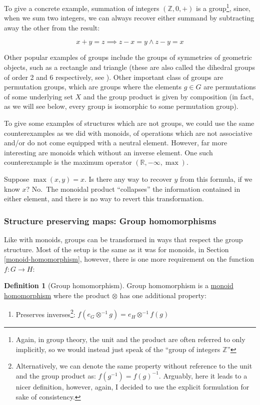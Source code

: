 \documentclass[
]{book}
\providecommand{\tightlist}{%
  \setlength{\itemsep}{0pt}\setlength{\parskip}{0pt}}
\theoremstyle{definition}
\newtheorem{definition}{Definition}[chapter]
\theoremstyle{definition}
\theoremstyle{definition}
\theoremstyle{definition}
\theoremstyle{remark}
\begin{document}
To give a concrete example, summation of integers \((\mathbb{Z}, 0, +)\) is a group\footnote{Again, in group theory, the unit and the product are often referred to only implicitly, so we would instead just speak of the ``group of integers \(\mathbb{Z}\)''}, since, when we sum two integers, we can always recover either summand by subtracting away the other from the result:

\[x + y = z \implies z - x = y \wedge z - y = x\]

Other popular examples of groups include the groups of symmetries of geometric objects, such as a rectangle and triangle (these are also called the dihedral groups of order 2 and 6 respectively, see ). Other important class of groups are permutation groups, which are groups where the elements \(g \in G\) are permutations of some underlying set \(X\) and the group product is given by composition (in fact, as we will see below, every group is isomorphic to some permutation group).

To give some examples of structures which are not groups, we could use the same counterexamples as we did with monoids, of operations which are not associative and/or do not come equipped with a neutral element. However, far more interesting are monoids which without an inverse element. One such counterexample is the maximum operator \((\mathbb{R}, -\infty, \max)\).

Suppose \(\max(x, y) = x\). Is there any way to recover \(y\) from this formula, if we know \(x\)? No.~The monoidal product ``collapses'' the information contained in either element, and there is no way to revert this transformation.

\subsubsection{Structure preserving maps: Group homomorphisms}\label{group-homomorphism}

Like with monoids, groups can be transformed in ways that respect the group structure. Most of the setup is the same as it was for monoids, in Section \ref{monoid-homomorphism}, however, there is one more requirement on the function \(f: G \to H\):

\begin{definition}[Group homomorphism]

Group homomorphism is a \hyperref[monoid-homomorphism]{monoid homomorphism} where the product \(\otimes\) has one additional property:

\begin{enumerate}
\def\labelenumi{\arabic{enumi}.}
\setcounter{enumi}{2}
\tightlist
\item
  Preserves inverses\footnote{Alternatively, we can denote the same property without reference to the unit and the group product as: \(f(g^{-1}) = f(g)^{-1}\). Arguably, here it leads to a nicer definition, however, again, I decided to use the explicit formulation for sake of consistency.}: \(f(e_G \otimes^{-1} g) = e_H \otimes^{-1}f(g)\)
\end{enumerate}

\end{definition}
\end{document}
